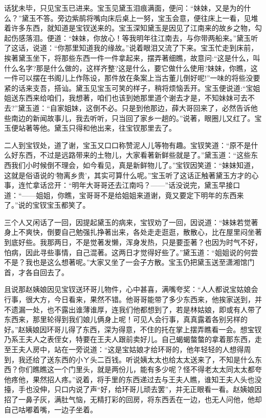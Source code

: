 \begin{parag}


    话犹未毕，只见宝玉已进来。宝玉见黛玉泪痕满面，便问：“妹妹，又是为的什么？”黛玉不答。旁边紫鹃将嘴向床后桌上一努，宝玉会意，便往床上一看，见堆着许多东西，就知道是宝钗送来的。宝玉深知黛玉是因见了江南来的故乡之物，勾起伤感落泪。便道：“妹妹，你放心！等我明年往江南去，与你带两船来。”黛玉听了这话，说道：“你那里知道我的缘故。”说着眼泪又流了下来。宝玉忙走到床前，挨著黛玉坐下，将那些东西一件一件拿起来，摆弄著细瞧，故意问:“这是什么，叫什么名字?那是什么做的，这样齐整?这是什么，要它做什么使用?妹妹，你瞧，这一件可以摆在书阁儿上作陈设，那件放在条案上当古董儿倒好呢!”一味的将些没要紧的话来支吾，搭讪。黛玉见宝玉可笑的样子，稍将烦恼丢开。宝玉便说道:“宝姐姐送东西来给咱们，我想著，咱们也该到她那里道个谢去才是，不知妹妹可去不去?”黛玉道：“自家姐妹，这倒不必。只是到他那边，薛大哥回来了，必然告诉他些南边的新闻故事儿，我去听听，只当回了家乡一趟的。”说著，眼圈儿又红了。宝玉便站著等他。黛玉只得和他出来，往宝钗那里去了。
\end{parag}


\begin{parag}


    二人到宝钗处，道了谢，宝玉又口口称赞泥人儿等物有趣。宝钗笑道：“原不是什么好东西，不过是远路带来的土物儿，大家看著新鲜些就是了。”黛玉道：“这些东西我们小时候倒不理会，如今看见，真是新鲜物儿了。”宝钗因笑道：“妹妹知道，这就是俗语说的‘物离乡贵’，其实可算什么呢。”宝玉听了这话正触著黛玉方才的心事，连忙拿话岔开：“明年大哥哥还去江南吗？——”话没说完，黛玉早接口道：“——姐姐，你瞧，宝哥哥不是给姐姐来道谢，竟又要定下明年的东西来了。”说的宝钗宝玉都笑了。
\end{parag}


\begin{parag}


    三个人又闲话了一回，因提起黛玉的病来，宝钗劝了一回，因说道：“妹妹若觉著身上不爽快，倒要自己勉强扎挣著出来，各处走走逛逛，散散心，比在屋里闷坐著到底好些。我那两日，不是觉著发懒，浑身发热，只是要歪著？也因为时气不好，怕病，因此寻些事情，自己混著。这两日才觉得好些了。”黛玉道：“姐姐说的何尝不是？我也是这么想著呢。”大家又坐了一会子方散。宝玉仍把黛玉送至潇湘馆门首，才各自回去了。
\end{parag}


\begin{parag}


    且说那赵姨娘因见宝钗送环哥儿物件，心中甚喜，满嘴夸奖：“人人都说宝姑娘会行事，很大方，今日看来，果然不错。他哥哥能带了多少东西来，他挨家送到，并不遗漏一处，也不露出谁薄谁厚，连我们他都想到了，若是林姑娘，即或有人带了东西来，那里轮得到我们娘儿俩身上呢！可见人会行事，真真露着各别另样的好。”赵姨娘因环哥儿得了东西，深为得意，不住的托在掌上摆弄瞧看一会。想宝钗乃系王夫人之表侄女，特要在王夫人跟前卖好儿。自己蝎蝎螫螫的拿着那东西，走至王夫人房中，站在一旁说道：“这是宝姑娘才给环哥的，他年轻轻的人想得周到，我还给了送东西的小ㄚ头二百钱。听说姨太太也给太太送来了，不知是什么东西？你们瞧瞧这一个门里头，就是两份儿，能有多少呢？怪不得老太太同太太都夸他疼他，果然招人疼。”说着，将手里的东西递过去与王夫人瞧，谁知王夫人头也没擡，手也没伸，只口内说了声“好，给环哥儿顽去罢”，并无正眼看一看。赵姨娘因招了一鼻子灰，满肚气恼，无精打彩的回房，将东西丢在一边，也无人问他，他却自己咕嘟着嘴，一边子坐着。
\end{parag}


